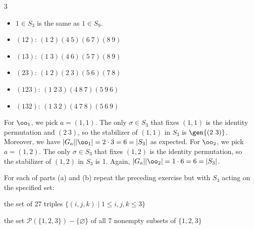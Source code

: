 \begin{sol}
\begin{multicols}{3}
\begin{itemize}
			\item $1 \in S_3$ is the same as $1 \in S_9$.
			\item $(1 2)$: $(1\ 2)(4\ 5)(6\ 7)(8\ 9)$
			\item $(1 3)$: $(1\ 3)(4\ 6)(5\ 7)(8\ 9)$
			\item $(2 3)$: $(1\ 2)(2\ 3)(5\ 6)(7\ 8)$
			\item $(1 2 3)$: $(1\ 2\ 3)(4\ 8\ 7)(5\ 9\ 6)$
			\item $(1 3 2)$: $(1\ 3\ 2)(4\ 7\ 8)(5\ 6\ 9)$
		\end{itemize}
	\end{multicols}
	For $\oo_1$, we pick $a = (1, 1)$. The only $\sigma \in S_3$ that fixes $(1, 1)$ is the identity permutation and $(2\ 3)$, so the stabilizer of $(1, 1)$ in $S_3$ is $\gen{(2\ 3)}$. Moreover, we have $|G_a||\oo_1| = 2 \cdot 3 = 6 = |S_3|$ as expected. For $\oo_2$, we pick $a = (1, 2)$. The only $\sigma \in S_3$ that fixes $(1, 2)$ is the identity permutation, so the stabilizer of $(1, 2)$ in $S_3$ is 1. Again, $|G_a||\oo_2| = 1 \cdot 6 = 6 = |S_3|$.
\end{sol}

\begin{exercise}
	For each of parts (a) and (b) repeat the preceding exercise but with $S_3$ acting on the specified set:
	\begin{subproblems}
		\item the set of 27 triples \(\{(i,j,k) \mid 1 \le i,j,k \le 3\}\)
		\item the set \(\mathcal{P}(\{1,2,3\}) - \{\varnothing\}\) of all 7 nonempty subsets of \(\{1,2,3\}\)
	\end{subproblems}
\end{exercise}

